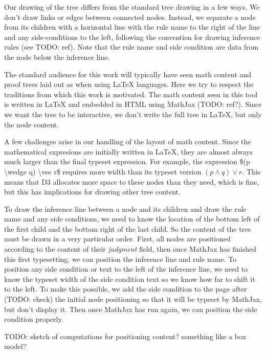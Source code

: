 \documentclass[conference]{IEEEtran}
\begin{document}
Our drawing of the tree differs from the standard tree drawing in a few ways. We don't draw links or edges between connected nodes. Instead, we separate a node from its children with a horizontal line with the rule name to the right of the line and any side-conditions to the left, following the convention for drawing inference rules (see TODO: ref). Note that the rule name and side condition are data from the node below the inference line.

The standard audience for this work will typically have seen math content and proof trees laid out as when using \LaTeX{} languages. Here we try to respect the traditions from which this work is motivated. The math content seen in this tool is written in \LaTeX{} and embedded in HTML using MathJax (TODO: ref?). Since we want the tree to be interactive, we don't write the full tree in \LaTeX{}, but only the node content.

A few challenges arise in our handling of the layout of math content. Since the mathematical expresions are initially written in \LaTeX{}, they are almost always much larger than the final typeset expression. For example, the expression \$(p \textbackslash wedge q) \textbackslash vee r\$ requires more width than its typeset version $(p \wedge q) \vee r$. This means that D3 allocates more space to these nodes than they need, which is fine, but this has implications for drawing other tree content.

To draw the inference line between a node and its children and draw the rule name and any side conditions, we need to know the location of the bottom left of the first child and the bottom right of the last child. So the content of the tree must be drawn in a very particular order. First, all nodes are positioned according to the content of their \textit{judgment} field, then once MathJax has finished this first typesetting, we can position the inference line and rule name. To position any side condition or text to the left of the inference line, we need to know the typeset width of the side condition text so we know how far to shift it to the left. To make this possible, we add the side condition to the page after (TODO: check) the initial node positioning so that it will be typeset by MathJax, but don't display it. Then once MathJax has run again, we can position the side condition properly.

TODO: sketch of computations for positioning content? something like a box model? \\
\end{document}
